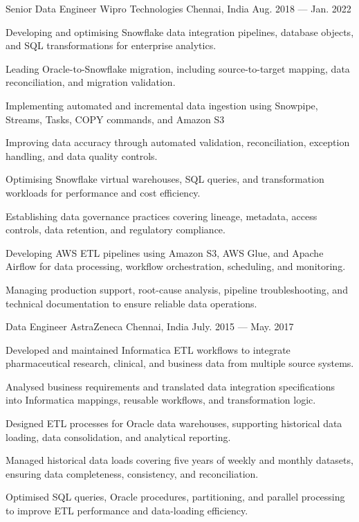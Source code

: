 \begin{cventries}
  \cventry
  {Senior Data Engineer} %
  {Wipro Technologies  } %
  {Chennai, India} %
  {Aug. 2018 --- Jan. 2022} %
  {
    \begin{cvitems} %
    \item {Developing and optimising Snowflake data integration pipelines, database objects, and SQL transformations for enterprise analytics.}
    \item {Leading Oracle-to-Snowflake migration, including source-to-target mapping, data reconciliation, and migration validation.}
    \item {Implementing automated and incremental data ingestion using Snowpipe, Streams, Tasks, COPY commands, and Amazon S3}
    \item {Improving data accuracy through automated validation, reconciliation, exception handling, and data quality controls.}
    \item {Optimising Snowflake virtual warehouses, SQL queries, and transformation workloads for performance and cost efficiency.}
    \item {Establishing data governance practices covering lineage, metadata, access controls, data retention, and regulatory compliance.}
    \item {Developing AWS ETL pipelines using Amazon S3, AWS Glue, and Apache Airflow for data processing, workflow orchestration, scheduling, and monitoring.}
    \item {Managing production support, root-cause analysis, pipeline troubleshooting, and technical documentation to ensure reliable data operations.}
    \end{cvitems}
  }

  \cventry
  {Data Engineer} %
  {AstraZeneca} %
  {Chennai, India} %
  {July. 2015 --- May. 2017} %
  {
    \begin{cvitems} %
    \item {Developed and maintained Informatica ETL workflows to integrate pharmaceutical research, clinical, and business data from multiple source systems.}
    \item {Analysed business requirements and translated data integration specifications into Informatica mappings, reusable workflows, and transformation logic.}
    \item {Designed ETL processes for Oracle data warehouses, supporting historical data loading, data consolidation, and analytical reporting.}
    \item {Managed historical data loads covering five years of weekly and monthly datasets, ensuring data completeness, consistency, and reconciliation.}
    \item {Optimised SQL queries, Oracle procedures, partitioning, and parallel processing to improve ETL performance and data-loading efficiency.}
    \end{cvitems}
  }


\end{cventries}
